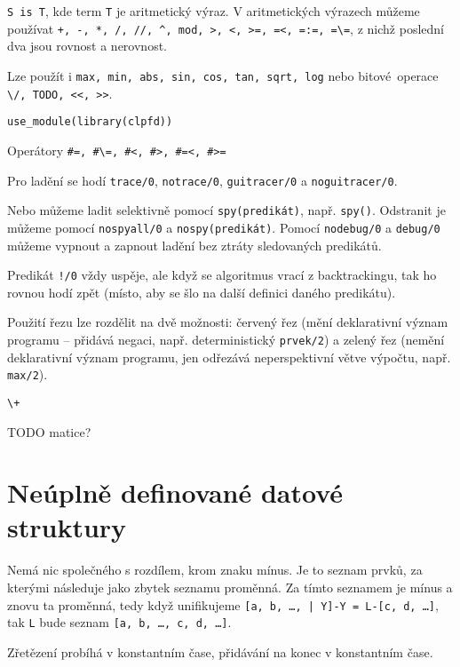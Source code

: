 \documentclass[12pt]{article}					%
\begin{document}
\begin{definice}[Aritmetika]
	\verb|S is T|, kde term \verb|T| je aritmetický výraz. V aritmetických výrazech můžeme používat \verb|+, -, *, /, //, ^, mod, >, <, >=, =<, =:=, =\=|, z nichž poslední dva jsou rovnost a nerovnost.

	Lze použít i \verb|max, min, abs, sin, cos, tan, sqrt, log| nebo bitové operace \verb|\/, TODO, <<, >>|.
\end{definice}

\begin{poznamka}
	\verb|use_module(library(clpfd))|

	Operátory \verb|#=, #\=, #<, #>, #=<, #>=|
\end{poznamka}


\begin{definice}[Ladění]
	Pro ladění se hodí \verb|trace/0|, \verb|notrace/0|, \verb|guitracer/0| a \verb|noguitracer/0|.

	Nebo můžeme ladit selektivně pomocí \verb|spy(predikát)|, např. \verb|spy()|. Odstranit je můžeme pomocí \verb|nospyall/0| a \verb|nospy(predikát)|. Pomocí \verb|nodebug/0| a \verb|debug/0| můžeme vypnout a zapnout ladění bez ztráty sledovaných predikátů.
\end{definice}

\begin{definice}[Řez]
	Predikát \verb|!/0| vždy uspěje, ale když se algoritmus vrací z backtrackingu, tak ho rovnou hodí zpět (místo, aby se šlo na další definici daného predikátu).

	Použití řezu lze rozdělit na dvě možnosti: červený řez (mění deklarativní význam programu – přidává negaci, např. deterministický \verb|prvek/2|) a zelený řez (nemění deklarativní význam programu, jen odřezává neperspektivní větve výpočtu, např. \verb|max/2|).
\end{definice}

\begin{definice}[Negace]
	\verb|\+|
\end{definice}

TODO matice?


\section{Neúplně definované datové struktury}
\begin{definice}
	Nemá nic společného s rozdílem, krom znaku mínus. Je to seznam prvků, za kterými následuje jako zbytek seznamu proměnná. Za tímto seznamem je mínus a znovu ta proměnná, tedy když unifikujeme \verb![a, b, …, | Y]-Y = L-[c, d, …]!, tak \verb|L| bude seznam \verb|[a, b, …, c, d, …]|.

	Zřetězení probíhá v konstantním čase, přidávání na konec v konstantním čase.
\end{definice}
\end{document}
